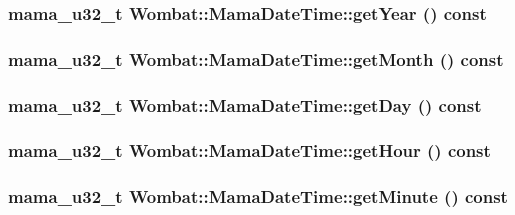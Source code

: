 \label{classWombat_1_1MamaDateTime_a4178844d857c831ead19d48df4d6ce4b}
\hypertarget{classWombat_1_1MamaDateTime_a431664f839454a265a15125940b8fdca}{
\subsubsection[{getYear}]{\setlength{\rightskip}{0pt plus 5cm}mama\_\-u32\_\-t Wombat::MamaDateTime::getYear () const}}
\label{classWombat_1_1MamaDateTime_a431664f839454a265a15125940b8fdca}
\hypertarget{classWombat_1_1MamaDateTime_abeb22c4a6074de90c3cdd741e98cb2b0}{
\subsubsection[{getMonth}]{\setlength{\rightskip}{0pt plus 5cm}mama\_\-u32\_\-t Wombat::MamaDateTime::getMonth () const}}
\label{classWombat_1_1MamaDateTime_abeb22c4a6074de90c3cdd741e98cb2b0}
\hypertarget{classWombat_1_1MamaDateTime_afe315dd02d8b4ced3d802a1bdc4ab22d}{
\subsubsection[{getDay}]{\setlength{\rightskip}{0pt plus 5cm}mama\_\-u32\_\-t Wombat::MamaDateTime::getDay () const}}
\label{classWombat_1_1MamaDateTime_afe315dd02d8b4ced3d802a1bdc4ab22d}
\hypertarget{classWombat_1_1MamaDateTime_add3164a27491279196e84304da904386}{
\subsubsection[{getHour}]{\setlength{\rightskip}{0pt plus 5cm}mama\_\-u32\_\-t Wombat::MamaDateTime::getHour () const}}
\label{classWombat_1_1MamaDateTime_add3164a27491279196e84304da904386}
\hypertarget{classWombat_1_1MamaDateTime_af910e4dc528a9d49b6515cf6d58d8362}{
\subsubsection[{getMinute}]{\setlength{\rightskip}{0pt plus 5cm}mama\_\-u32\_\-t Wombat::MamaDateTime::getMinute () const}}
